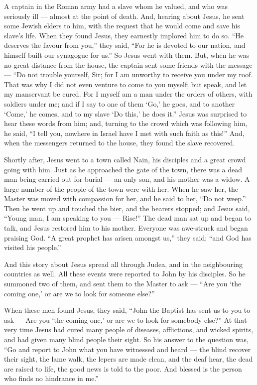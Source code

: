  A captain in the Roman army had a slave whom he valued, and
who was seriously ill --- almost at the point of death. 
And, hearing about Jesus, he sent some Jewish elders to him, with the
request that he would come and save his slave's life.  When
they found Jesus, they earnestly implored him to do so. ``He deserves
the favour from you,'' they said,  ``For he is devoted to
our nation, and himself built our synagogue for us.''  So
Jesus went with them. But, when he was no great distance from the house,
the captain sent some friends with the message --- ``Do not trouble
yourself, Sir; for I am unworthy to receive you under my roof.
 That was why I did not even venture to come to you myself;
but speak, and let my manservant be cured.  For I myself am
a man under the orders of others, with soldiers under me; and if I say
to one of them `Go,' he goes, and to another `Come,' he comes, and to my
slave `Do this,' he does it.''  Jesus was surprised to hear
these words from him; and, turning to the crowd which was following him,
he said, ``I tell you, nowhere in Israel have I met with such faith as
this!''  And, when the messengers returned to the house,
they found the slave recovered.

 Shortly after, Jesus went to a town called Nain, his
disciples and a great crowd going with him.  Just as he
approached the gate of the town, there was a dead man being carried out
for burial --- an only son, and his mother was a widow. A large number
of the people of the town were with her.  When he saw her,
the Master was moved with compassion for her, and he said to her, ``Do
not weep.''  Then he went up and touched the bier, and the
bearers stopped; and Jesus said, ``Young man, I am speaking to you ---
Rise!''  The dead man sat up and began to talk, and Jesus
restored him to his mother.  Everyone was awe-struck and
began praising God. ``A great prophet has arisen amongst us,'' they
said; ``and God has visited his people.''

 And this story about Jesus spread all through Judea, and
in the neighbouring countries as well.  All these events
were reported to John by his disciples.  So he summoned two
of them, and sent them to the Master to ask --- ``Are you `the coming
one,' or are we to look for someone else?''

 When these men found Jesus, they said, ``John the Baptist
has sent us to you to ask --- Are you `the coming one,' or are we to
look for somebody else?''  At that very time Jesus had
cured many people of diseases, afflictions, and wicked spirits, and had
given many blind people their sight.  So his answer to the
question was, ``Go and report to John what you have witnessed and heard
--- the blind recover their sight, the lame walk, the lepers are made
clean, and the deaf hear, the dead are raised to life, the good news is
told to the poor.  And blessed is the person who finds no
hindrance in me.''

